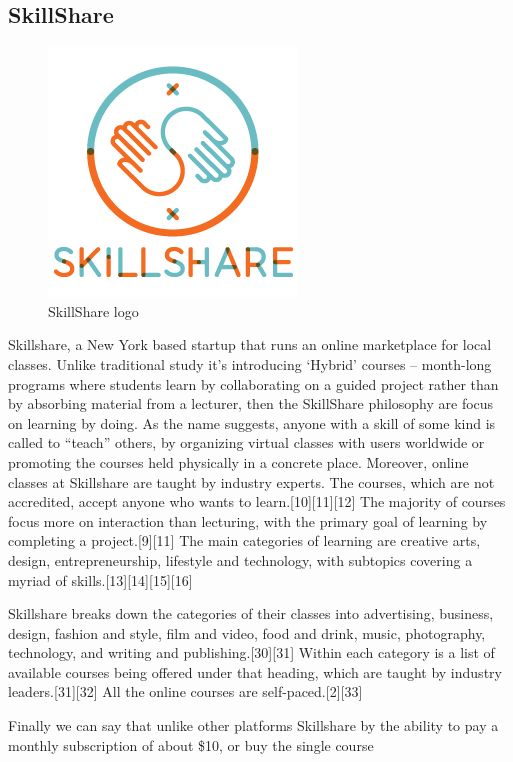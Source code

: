 \subsection{SkillShare}
\label{subsec:SkillShare}
\begin{figure}[htb] %
 \centering
 \includegraphics[width=0.5\linewidth]{images/chapter1/skillshare.jpg}\hfill
 \caption[SkillShare logo]{SkillShare logo}
 \label{fig:fourV}
\end{figure}




Skillshare, a New York based startup that runs an online marketplace for local classes.
Unlike traditional study it’s introducing ‘Hybrid’ courses – month-long programs where students learn by collaborating on a guided project rather than by absorbing material from a lecturer, then the SkillShare philosophy are focus on learning by doing.
As the name suggests, anyone with a skill of some kind is called to “teach” others, by organizing virtual classes with users worldwide or promoting the courses held physically in a concrete place.
Moreover, online classes at Skillshare are taught by industry experts. The courses, which are not accredited, accept anyone who wants to learn.[10][11][12] The majority of courses focus more on interaction than lecturing, with the primary goal of learning by completing a project.[9][11] The main categories of learning are creative arts, design, entrepreneurship, lifestyle and technology, with subtopics covering a myriad of skills.[13][14][15][16]

Skillshare breaks down the categories of their classes into advertising, business, design, fashion and style, film and video, food and drink, music, photography, technology, and writing and publishing.[30][31] Within each category is a list of available courses being offered under that heading, which are taught by industry leaders.[31][32] All the online courses are self-paced.[2][33]

Finally we can say that unlike other platforms Skillshare by the ability to pay a monthly subscription of about \$10, or buy the single course